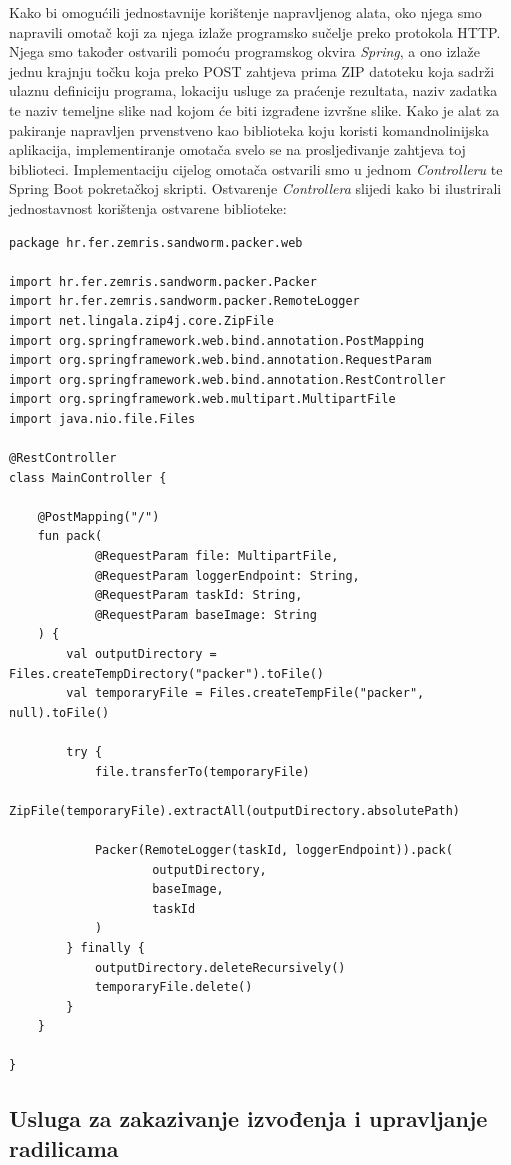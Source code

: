 \documentclass[times, utf8, zavrsni]{fer}
\begin{document}
{Kako bi omogućili jednostavnije korištenje napravljenog alata, oko njega smo napravili omotač koji za njega izlaže programsko sučelje preko protokola HTTP. Njega smo također ostvarili pomoću programskog okvira {\textit{Spring}}, a ono izlaže jednu krajnju točku koja preko POST zahtjeva prima ZIP datoteku koja sadrži ulaznu definiciju programa, lokaciju usluge za praćenje rezultata, naziv zadatka te naziv temeljne slike nad kojom će biti izgrađene izvršne slike. Kako je alat za pakiranje napravljen prvenstveno kao biblioteka koju koristi komandnolinijska aplikacija, implementiranje omotača svelo se na prosljeđivanje zahtjeva toj biblioteci. Implementaciju cijelog omotača ostvarili smo u jednom {\textit{Controlleru}} te Spring Boot pokretačkoj skripti. Ostvarenje {\textit{Controllera}} slijedi kako bi ilustrirali jednostavnost korištenja ostvarene biblioteke:

\begin{lstlisting}
package hr.fer.zemris.sandworm.packer.web

import hr.fer.zemris.sandworm.packer.Packer
import hr.fer.zemris.sandworm.packer.RemoteLogger
import net.lingala.zip4j.core.ZipFile
import org.springframework.web.bind.annotation.PostMapping
import org.springframework.web.bind.annotation.RequestParam
import org.springframework.web.bind.annotation.RestController
import org.springframework.web.multipart.MultipartFile
import java.nio.file.Files

@RestController
class MainController {

    @PostMapping("/")
    fun pack(
            @RequestParam file: MultipartFile,
            @RequestParam loggerEndpoint: String,
            @RequestParam taskId: String,
            @RequestParam baseImage: String
    ) {
        val outputDirectory = Files.createTempDirectory("packer").toFile()
        val temporaryFile = Files.createTempFile("packer", null).toFile()

        try {
            file.transferTo(temporaryFile)
            ZipFile(temporaryFile).extractAll(outputDirectory.absolutePath)

            Packer(RemoteLogger(taskId, loggerEndpoint)).pack(
                    outputDirectory,
                    baseImage,
                    taskId
            )
        } finally {
            outputDirectory.deleteRecursively()
            temporaryFile.delete()
        }
    }

}
\end{lstlisting}

\subsection{Usluga za zakazivanje izvođenja i upravljanje radilicama}

}
\end{document}
